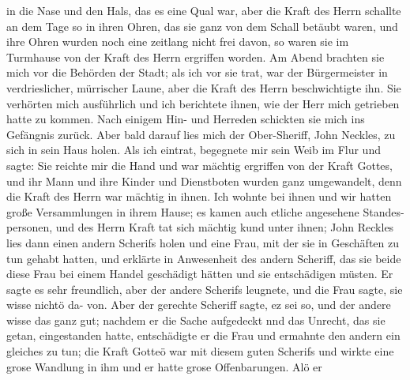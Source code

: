 in die Nase und den Hals, das es eine Qual war, aber die
Kraft des Herrn schallte an dem Tage so in ihren Ohren, das
sie ganz von dem Schall betäubt waren, und ihre Ohren wurden
noch eine zeitlang nicht frei davon, so waren sie im Turmhause
von der Kraft des Herrn ergriffen worden. Am Abend brachten
sie mich vor die Behörden der Stadt; als ich vor sie trat, war
der Bürgermeister in verdrieslicher, mürrischer Laune, aber die
Kraft des Herrn beschwichtigte ihn. Sie verhörten mich 
ausführlich und ich berichtete ihnen, wie der Herr mich 
getrieben hatte
zu kommen. Nach einigem Hin- und Herreden schickten sie mich
ins Gefängnis zurück. Aber bald darauf lies mich der Ober-Sheriff,
John Neckles, zu sich in 
sein Haus holen. Als ich eintrat, begegnete mir sein Weib 
im Flur und sagte:  Sie reichte mir die Hand und war mächtig
ergriffen von der Kraft Gottes, und ihr Mann und ihre Kinder
und Dienstboten wurden ganz umgewandelt, denn die Kraft des
Herrn war mächtig in ihnen. Ich wohnte bei ihnen und wir
hatten große Versammlungen in ihrem Hause; es kamen auch
etliche angesehene Standes-personen, und des Herrn Kraft tat sich
mächtig kund unter ihnen; John Reckles lies dann einen andern
Scherifs holen und eine Frau, mit der sie in Geschäften zu tun
gehabt hatten, und erklärte in Anwesenheit des andern Scheriff,
das sie beide diese Frau bei einem Handel geschädigt hätten und
sie entschädigen müsten. Er sagte es sehr freundlich, aber der
andere Scherifs leugnete, und die Frau sagte, sie wisse nichtö da-
von. Aber der gerechte Scheriff sagte, ez sei so, und der andere
wisse das ganz gut; nachdem er die Sache aufgedeckt nnd das
Unrecht, das sie getan, eingestanden hatte, entschädigte er die
Frau und ermahnte den andern ein gleiches zu tun; die Kraft
Gotteö war mit diesem guten Scherifs und wirkte eine grose
Wandlung in ihm und er hatte grose Offenbarungen. Alö er


